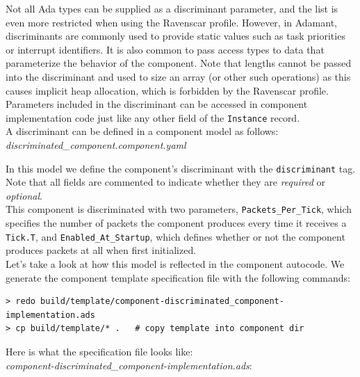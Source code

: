 Not all Ada types can be supplied as a discriminant parameter, and the list is even more restricted when using the Ravenscar profile. However, in Adamant, discriminants are commonly used to provide static values such as task priorities or interrupt identifiers. It is also common to pass access types to data that parameterize the behavior of the component. Note that lengths cannot be passed into the discriminant and used to size an array (or other such operations) as this causes implicit heap allocation, which is forbidden by the Ravenscar profile. Parameters included in the discriminant can be accessed in component implementation code just like any other field of the \texttt{Instance} record. \\ 

A discriminant can be defined in a component model as follows: \\

\textit{discriminated\_component.component.yaml}

In this model we define the component's discriminant with the \texttt{discriminant} tag. Note that all fields are commented to indicate whether they are \textit{required} or \textit{optional}. \\

This component is discriminated with two parameters, \texttt{Packets\_Per\_Tick}, which specifies the number of packets the component produces every time it receives a \texttt{Tick.T}, and \texttt{Enabled\_At\_Startup}, which defines whether or not the component produces packets at all when first initialized. \\

Let's take a look at how this model is reflected in the component autocode. We generate the component template specification file with the following commands:

\vspace{5mm} %
\begin{verbatim}
> redo build/template/component-discriminated_component-implementation.ads
> cp build/template/* .   # copy template into component dir
\end{verbatim}
\vspace{5mm} %

Here is what the specification file looks like: \\

\textit{component-discriminated\_component-implementation.ads}:

